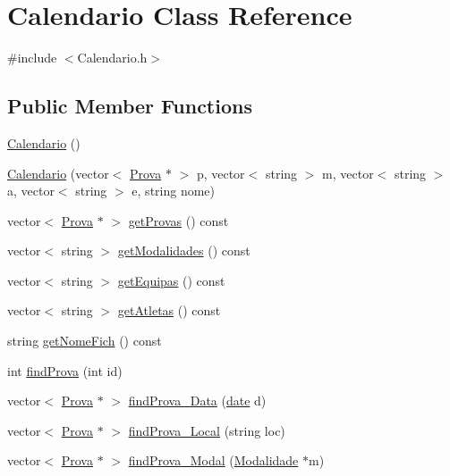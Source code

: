 \hypertarget{class_calendario}{}\section{Calendario Class Reference}
\label{class_calendario}


{\ttfamily \#include $<$Calendario.\+h$>$}

\subsection*{Public Member Functions}
\begin{DoxyCompactItemize}
\item 
\hyperlink{class_calendario_a2aa60aa6d3c27f696018cc09d2748ea5}{Calendario} ()
\item 
\hyperlink{class_calendario_a5dd6d18ea3711495912ba913c3b08c24}{Calendario} (vector$<$ \hyperlink{class_prova}{Prova} $\ast$ $>$ p, vector$<$ string $>$ m, vector$<$ string $>$ a, vector$<$ string $>$ e, string nome)
\item 
vector$<$ \hyperlink{class_prova}{Prova} $\ast$ $>$ \hyperlink{class_calendario_a614b94b28d14852af27b60c49342b52c}{get\+Provas} () const 
\item 
vector$<$ string $>$ \hyperlink{class_calendario_aa92791918d953f34250063a67d0d6232}{get\+Modalidades} () const 
\item 
vector$<$ string $>$ \hyperlink{class_calendario_aff13d470983e46172aca04dda560332d}{get\+Equipas} () const 
\item 
vector$<$ string $>$ \hyperlink{class_calendario_abfc38a3a96e33ec237496ed83c3259a5}{get\+Atletas} () const 
\item 
string \hyperlink{class_calendario_a8ec3b8d1862fc893922561d97e4341cb}{get\+Nome\+Fich} () const 
\item 
int \hyperlink{class_calendario_a0232407ed153d613706113bad31d63ab}{find\+Prova} (int id)
\item 
vector$<$ \hyperlink{class_prova}{Prova} $\ast$ $>$ \hyperlink{class_calendario_acb99bce549da591f00766bde187c6ec2}{find\+Prova\+\_\+\+Data} (\hyperlink{structdate}{date} d)
\item 
vector$<$ \hyperlink{class_prova}{Prova} $\ast$ $>$ \hyperlink{class_calendario_a793b4bc54543406742b0fcd16bd95c26}{find\+Prova\+\_\+\+Local} (string loc)
\item 
vector$<$ \hyperlink{class_prova}{Prova} $\ast$ $>$ \hyperlink{class_calendario_a4213931fe492f55a4b6981c3dca02479}{find\+Prova\+\_\+\+Modal} (\hyperlink{class_modalidade}{Modalidade} $\ast$m)

\end{DoxyCompactItemize}
